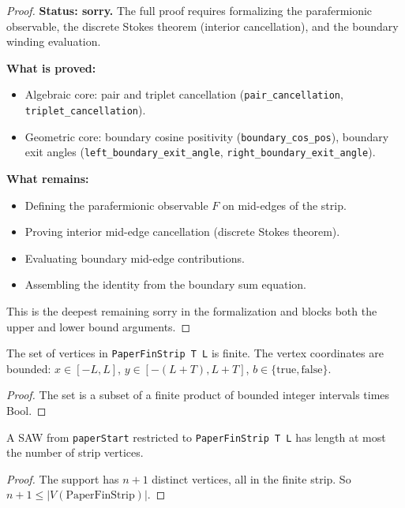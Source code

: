 \begin{proof}
  \textbf{Status: sorry.}
  The full proof requires formalizing the parafermionic observable,
  the discrete Stokes theorem (interior cancellation), and the
  boundary winding evaluation.

  \textbf{What is proved:}
  \begin{itemize}
  \item Algebraic core: pair and triplet cancellation (\texttt{pair\_cancellation},
    \texttt{triplet\_cancellation}).
  \item Geometric core: boundary cosine positivity (\texttt{boundary\_cos\_pos}),
    boundary exit angles (\texttt{left\_boundary\_exit\_angle},
    \texttt{right\_boundary\_exit\_angle}).
  \end{itemize}

  \textbf{What remains:}
  \begin{itemize}
  \item Defining the parafermionic observable $F$ on mid-edges of the strip.
  \item Proving interior mid-edge cancellation (discrete Stokes theorem).
  \item Evaluating boundary mid-edge contributions.
  \item Assembling the identity from the boundary sum equation.
  \end{itemize}
  This is the deepest remaining sorry in the formalization and blocks
  both the upper and lower bound arguments.
\end{proof}

\begin{lemma}\label{lem:paper_fin_strip_finite}
\leanok
  The set of vertices in \texttt{PaperFinStrip T L} is finite.
  The vertex coordinates are bounded: $x \in [-L, L]$,
  $y \in [-(L+T), L+T]$, $b \in \{\mathrm{true}, \mathrm{false}\}$.
\end{lemma}
\begin{proof}
\leanok
  The set is a subset of a finite product of bounded integer intervals
  times Bool.
\end{proof}

\begin{lemma}\label{lem:paper_saw_length_bound}
\leanok
{}
  A SAW from \texttt{paperStart} restricted to \texttt{PaperFinStrip T L}
  has length at most the number of strip vertices.
\end{lemma}
\begin{proof}
\leanok
  The support has $n+1$ distinct vertices, all in the finite strip.
  So $n + 1 \leq |V(\text{PaperFinStrip})|$.
\end{proof}

